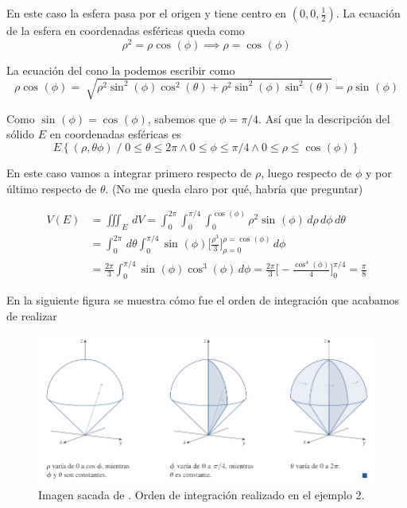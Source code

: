 \documentclass[12pt]{article}
\begin{document}
En este caso la esfera pasa por el origen y tiene centro en $ (0,0,\frac{1}{2}) $. La ecuación de la esfera en coordenadas esféricas queda como
\[
  \rho^2=\rho\cos^{}(\phi) \implies \rho=\cos^{}(\phi)
\]

La ecuación del cono la podemos escribir como 
\[
  \rho\cos^{}(\phi)=\sqrt[]{\rho^2\sin^{2}(\phi)\cos^{2}(\theta)+\rho^2\sin^{2}(\phi)\sin^{2}(\theta)}=\rho\sin^{}(\phi)
\]

Como $ \sin^{}(\phi)=\cos^{}(\phi) $, sabemos que $ \phi=\pi/4 $. Así que la descripción del sólido $ E $ en coordenadas esféricas es 
\[
E\left\{(\rho,\theta\phi) \;/\; 0\leq \theta\leq 2\pi \land 0\leq \phi\leq \pi/4 \land 0\leq \rho\leq \cos^{}(\phi)\right\}
\]

En este caso vamos a integrar primero respecto de $ \rho $, luego respecto de $ \phi $ y por último respecto de $ \theta $. (No me queda claro por qué, habría que preguntar)

\begin{align*}
  V(E) &= \iiint_{E} \,dV = \int_{0}^{2\pi} \int_{0}^{\pi/4} \int_{0}^{\cos^{}(\phi)} \rho^2\sin^{}(\phi) \,d\rho\,d\phi\,d\theta\\
       &= \int_{0}^{2\pi}  \,d\theta\int_{0}^{\pi/4} \sin^{}(\phi) \Bigg[\frac{\rho^3}{3}\Bigg]_{\rho=0}^{\rho=\cos^{}(\phi)} \,d\phi\\
        &= \frac{2\pi}{3}\int_{0}^{\pi/4} \sin^{}(\phi)\cos^{3}(\phi) \,d\phi=\frac{2\pi}{3}\Bigg[-\frac{\cos^{4}(\phi)}{4}\Bigg]_{0}^{\pi/4}=\frac{\pi}{8}
\end{align*}

En la siguiente figura se muestra cómo fue el orden de integración que acabamos de realizar

\begin{figure}[H]
  \centering
  \includegraphics[width=\linewidth]{imagenes/orden-integracion-esfericas-ej2.png}
  \caption{Imagen sacada de \parencite{stewart2}. Orden de integración realizado en el ejemplo 2.}
  \label{fig:coord-esf-resolucion-ej2}
\end{figure}



\newpage
{}
\printbibliography
\end{document}
